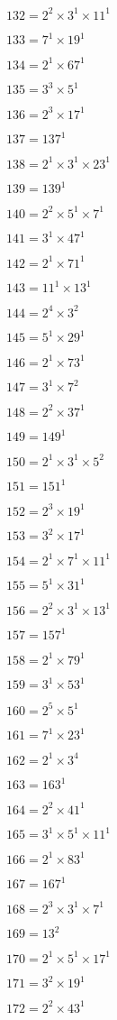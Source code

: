 $132 = 2^{2} × 3^{1} × 11^{1}$

$133 = 7^{1} × 19^{1}$

$134 = 2^{1} × 67^{1}$

$135 = 3^{3} × 5^{1}$

$136 = 2^{3} × 17^{1}$

$137 = 137^{1}$

$138 = 2^{1} × 3^{1} × 23^{1}$

$139 = 139^{1}$

$140 = 2^{2} × 5^{1} × 7^{1}$

$141 = 3^{1} × 47^{1}$

$142 = 2^{1} × 71^{1}$

$143 = 11^{1} × 13^{1}$

$144 = 2^{4} × 3^{2}$

$145 = 5^{1} × 29^{1}$

$146 = 2^{1} × 73^{1}$

$147 = 3^{1} × 7^{2}$

$148 = 2^{2} × 37^{1}$

$149 = 149^{1}$

$150 = 2^{1} × 3^{1} × 5^{2}$

$151 = 151^{1}$

$152 = 2^{3} × 19^{1}$

$153 = 3^{2} × 17^{1}$

$154 = 2^{1} × 7^{1} × 11^{1}$

$155 = 5^{1} × 31^{1}$

$156 = 2^{2} × 3^{1} × 13^{1}$

$157 = 157^{1}$

$158 = 2^{1} × 79^{1}$

$159 = 3^{1} × 53^{1}$

$160 = 2^{5} × 5^{1}$

$161 = 7^{1} × 23^{1}$

$162 = 2^{1} × 3^{4}$

$163 = 163^{1}$

$164 = 2^{2} × 41^{1}$

$165 = 3^{1} × 5^{1} × 11^{1}$

$166 = 2^{1} × 83^{1}$

$167 = 167^{1}$

$168 = 2^{3} × 3^{1} × 7^{1}$

$169 = 13^{2}$

$170 = 2^{1} × 5^{1} × 17^{1}$

$171 = 3^{2} × 19^{1}$

$172 = 2^{2} × 43^{1}$

